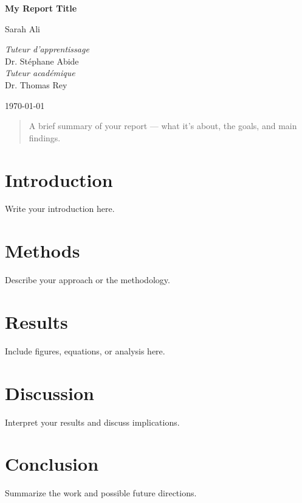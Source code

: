 \documentclass[12pt,a4paper]{report}
\begin{document}
\begin{titlepage}
    \centering
    \vspace*{2cm}
    
    {\Huge \textbf{My Report Title}\par}
    \vspace{2cm}
    
    {\Large Sarah Ali\par}
    
    \vspace{1cm}
    \begin{flushright}
        \textit{Tuteur d'apprentissage} \\ Dr. Stéphane Abide\\[0.3em]
        \textit{Tuteur académique} \\ Dr. Thomas Rey
    \end{flushright}
    
    \vfill
    {\large \today\par}
\end{titlepage}

\begin{abstract}
A brief summary of your report — what it’s about, the goals, and main findings.
\end{abstract}

\tableofcontents
\newpage

\chapter{Introduction}
Write your introduction here.

\chapter{Methods}
Describe your approach or the methodology.

\chapter{Results}
Include figures, equations, or analysis here.

\chapter{Discussion}
Interpret your results and discuss implications.

\chapter{Conclusion}
Summarize the work and possible future directions.


\end{document}
